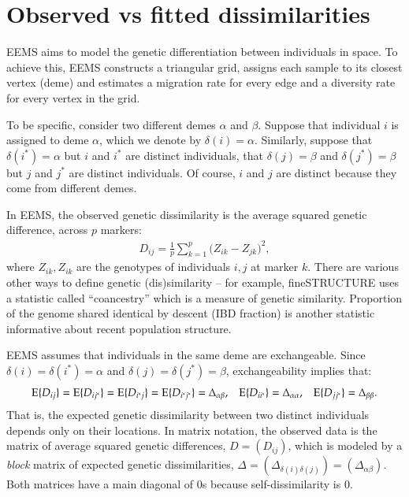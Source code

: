 \documentclass[a4paper,10pt,DIV=15,titlepage,mpinclude=true]{scrartcl}
\newcommand{\specialrm}[1]{\mathrm{#1}}
\providecommand{\E}{\specialrm{E}}
\begin{document}
\newpage 

\section{Observed vs fitted dissimilarities} \label{sec:obsr-vs-fitted-dist}

EEMS aims to model the genetic differentiation between individuals in space. To achieve this, EEMS constructs a triangular grid, assigns each sample to its closest vertex (deme) and estimates a migration rate for every edge and a diversity rate for every vertex in the grid. %

To be specific, consider two different demes $\alpha$ and $\beta$. Suppose that individual $i$ is assigned to deme $\alpha$, which we denote by $\delta(i) = \alpha$. Similarly, suppose that $\delta(i^*) = \alpha$ but $i$ and $i^*$ are distinct individuals, that $\delta(j) = \beta$ and $\delta(j^*) = \beta$ but $j$ and $j^*$ are distinct individuals. Of course, $i$ and $j$ are distinct because they come from different demes.

In EEMS, the observed genetic dissimilarity is the average squared genetic difference, across $p$ markers:
\begin{align}
D_{ij} = \frac{1}{p} \sum_{k=1}^p \big(Z_{ik} - Z_{jk}\big)^2,
\end{align}
where $Z_{ik},Z_{ik}$ are the genotypes of individuals $i,j$ at marker $k$. There are various other ways to define genetic (dis)similarity -- for example, fineSTRUCTURE uses a statistic called ``coancestry'' which is a measure of genetic similarity. Proportion of the genome shared identical by descent (IBD fraction) is another statistic informative about recent population structure. %

EEMS assumes that individuals in the same deme are exchangeable. Since $\delta(i) = \delta(i^*) = \alpha$ and $\delta(j) = \delta(j^*) = \beta$, exchangeability implies that:
\begin{align}
\E\small\{D_{ij}\small\} = \E\small\{D_{ij^*}\small\} = \E\small\{D_{i^*j}\small\} = \E\small\{D_{i^*j^*}\small\} = \Delta_{\alpha\beta},&&
\E\small\{D_{ii^*}\small\} = \Delta_{\alpha\alpha},&&
\E\small\{D_{jj^*}\small\} = \Delta_{\beta\beta}.
\end{align}
That is, the expected genetic dissimilarity between two distinct individuals depends only on their locations. In matrix notation, the observed data is the matrix of average squared genetic differences, $D = (D_{ij})$, which is modeled by a \textit{block} matrix of expected genetic dissimilarities, $\Delta = (\Delta_{\delta(i)\delta(j)}) = (\Delta_{\alpha\beta})$. Both matrices have a main diagonal of 0s because self-dissimilarity is 0.
\end{document}
